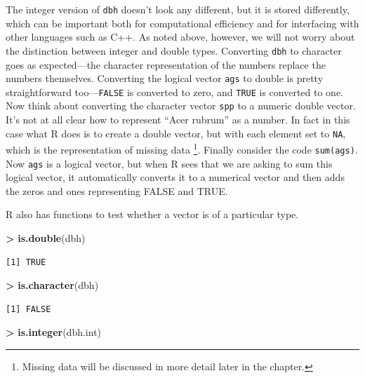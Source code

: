 \documentclass[]{krantz}
\makeatletter
\newenvironment{Shaded}{\begin{snugshade}}{\end{snugshade}}
\newcommand{\KeywordTok}[1]{\textcolor[rgb]{0.27,0.27,0.27}{\textbf{#1}}}
\newcommand{\NormalTok}[1]{#1}
\newcommand{\OperatorTok}[1]{\textcolor[rgb]{0.43,0.43,0.43}{\textbf{#1}}}
\newcommand{\StringTok}[1]{\textcolor[rgb]{0.5,0.5,0.5}{#1}}
\newenvironment{kframe}{%
\medskip{}
\setlength{\fboxsep}{.8em}
 \def\at@end@of@kframe{}%
 \ifinner\ifhmode%
  \def\at@end@of@kframe{\end{minipage}}%
  \begin{minipage}{\columnwidth}%
 \fi\fi%
 \def\FrameCommand##1{\hskip\@totalleftmargin \hskip-\fboxsep
 \colorbox{shadecolor}{##1}\hskip-\fboxsep
     \hskip-\linewidth \hskip-\@totalleftmargin \hskip\columnwidth}%
 \MakeFramed {\advance\hsize-\width
   \@totalleftmargin\z@ \linewidth\hsize
   \@setminipage}}%
 {\par\unskip\endMakeFramed%
 \at@end@of@kframe}
\renewenvironment{Shaded}{\begin{kframe}}{\end{kframe}}
\makeatother
\begin{document}
The integer version of \texttt{dbh} doesn't look any different, but it is stored differently, which can be important both for computational efficiency and for interfacing with other languages such as C++. As noted above, however, we will not worry about the distinction between integer and double types. Converting \texttt{dbh} to character goes as expected---the character representation of the numbers replace the numbers themselves. Converting the logical vector \texttt{ags} to double is pretty straightforward too---\texttt{FALSE} is converted to zero, and \texttt{TRUE} is converted to one. Now think about converting the character vector \texttt{spp} to a numeric double vector. It's not at all clear how to represent ``Acer rubrum'' as a number. In fact in this case what R does is to create a double vector, but with each element set to \texttt{NA}, which is the representation of missing data \footnote{Missing data will be discussed in more detail later in the chapter.}. Finally consider the code \texttt{sum(ags)}. Now \texttt{ags} is a logical vector, but when R sees that we are asking to sum this logical vector, it automatically converts it to a numerical vector and then adds the zeros and ones representing FALSE and TRUE.

R also has functions to test whether a vector is of a particular type.

\begin{Shaded}
\begin{Highlighting}[]
\OperatorTok{>}\StringTok{ }\KeywordTok{is.double}\NormalTok{(dbh)}
\end{Highlighting}
\end{Shaded}

\begin{verbatim}
[1] TRUE
\end{verbatim}

\begin{Shaded}
\begin{Highlighting}[]
\OperatorTok{>}\StringTok{ }\KeywordTok{is.character}\NormalTok{(dbh)}
\end{Highlighting}
\end{Shaded}

\begin{verbatim}
[1] FALSE
\end{verbatim}

\begin{Shaded}
\begin{Highlighting}[]
\OperatorTok{>}\StringTok{ }\KeywordTok{is.integer}\NormalTok{(dbh.int)}
\end{Highlighting}
\end{Shaded}
\end{document}
